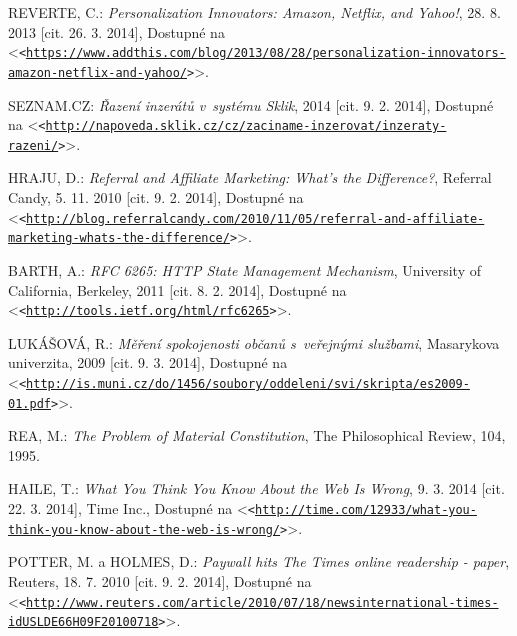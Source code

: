 \documentclass[12pt,twoside,openany]{fithesis}
\let\origurl\url
\def\url#1{\texttt{<\origurl{#1}>}}
\begin{document}
\begin{thebibliography}{99}

REVERTE, C.: \emph{Personalization Innovators: Amazon, Netflix, and Yahoo!}, 28. 8. 2013 [cit. 26. 3. 2014], Dostupné na {\textless}\url{https://www.addthis.com/blog/2013/08/28/personalization-innovators-amazon-netflix-and-yahoo/}{\textgreater}. 


SEZNAM.CZ: \emph{Řazení inzerátů v~systému Sklik}, 2014 [cit. 9. 2. 2014], Dostupné na {\textless}\url{http://napoveda.sklik.cz/cz/zaciname-inzerovat/inzeraty-razeni/}{\textgreater}. 


HRAJU, D.: \emph{Referral and Affiliate Marketing: What's the Difference?}, Referral Candy, 5. 11. 2010 [cit. 9. 2. 2014], Dostupné na {\textless}\url{http://blog.referralcandy.com/2010/11/05/referral-and-affiliate-marketing-whats-the-difference/}{\textgreater}. 


BARTH, A.: \emph{RFC 6265: HTTP State Management Mechanism}, University of California, Berkeley, 2011 [cit. 8. 2. 2014], Dostupné na {\textless}\url{http://tools.ietf.org/html/rfc6265}{\textgreater}. 


LUKÁŠOVÁ, R.: \emph{Měření spokojenosti občanů s~veřejnými službami}, Masarykova univerzita, 2009 [cit. 9. 3. 2014], Dostupné na {\textless}\url{http://is.muni.cz/do/1456/soubory/oddeleni/svi/skripta/es2009-01.pdf}{\textgreater}. 


REA, M.: \emph{The Problem of Material Constitution}, The Philosophical Review, 104, 1995. 

HAILE, T.: \emph{What You Think You Know About the Web Is Wrong}, 9. 3. 2014 [cit. 22. 3. 2014], Time Inc., Dostupné na {\textless}\url{http://time.com/12933/what-you-think-you-know-about-the-web-is-wrong/}{\textgreater}. 

POTTER, M. a HOLMES, D.: \emph{Paywall hits The Times online readership - paper}, Reuters, 18. 7. 2010 [cit. 9. 2. 2014], Dostupné na {\textless}\url{http://www.reuters.com/article/2010/07/18/newsinternational-times-idUSLDE66H09F20100718}{\textgreater}. 


\end{thebibliography}
\end{document}
